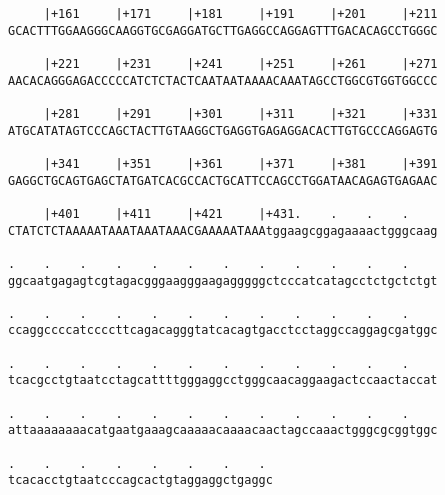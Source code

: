\documentclass{article}
\begin{document}
\begin{Verbatim}
     |+161     |+171     |+181     |+191     |+201     |+211
GCACTTTGGAAGGGCAAGGTGCGAGGATGCTTGAGGCCAGGAGTTTGACACAGCCTGGGC
                                                            
     |+221     |+231     |+241     |+251     |+261     |+271
AACACAGGGAGACCCCCATCTCTACTCAATAATAAAACAAATAGCCTGGCGTGGTGGCCC
                                                            
     |+281     |+291     |+301     |+311     |+321     |+331
ATGCATATAGTCCCAGCTACTTGTAAGGCTGAGGTGAGAGGACACTTGTGCCCAGGAGTG
                                                            
     |+341     |+351     |+361     |+371     |+381     |+391
GAGGCTGCAGTGAGCTATGATCACGCCACTGCATTCCAGCCTGGATAACAGAGTGAGAAC
                                                            
     |+401     |+411     |+421     |+431.    .    .    .    
CTATCTCTAAAAATAAATAAATAAACGAAAAATAAAtggaagcggagaaaactgggcaag
                                                            
.    .    .    .    .    .    .    .    .    .    .    .    
ggcaatgagagtcgtagacgggaagggaagagggggctcccatcatagcctctgctctgt
                                                            
.    .    .    .    .    .    .    .    .    .    .    .    
ccaggccccatccccttcagacagggtatcacagtgacctcctaggccaggagcgatggc
                                                            
.    .    .    .    .    .    .    .    .    .    .    .    
tcacgcctgtaatcctagcattttgggaggcctgggcaacaggaagactccaactaccat
                                                            
.    .    .    .    .    .    .    .    .    .    .    .    
attaaaaaaaacatgaatgaaagcaaaaacaaaacaactagccaaactgggcgcggtggc
                                                            
.    .    .    .    .    .    .    . 
tcacacctgtaatcccagcactgtaggaggctgaggc
                                     
                                     
\end{Verbatim}
\end{document}
